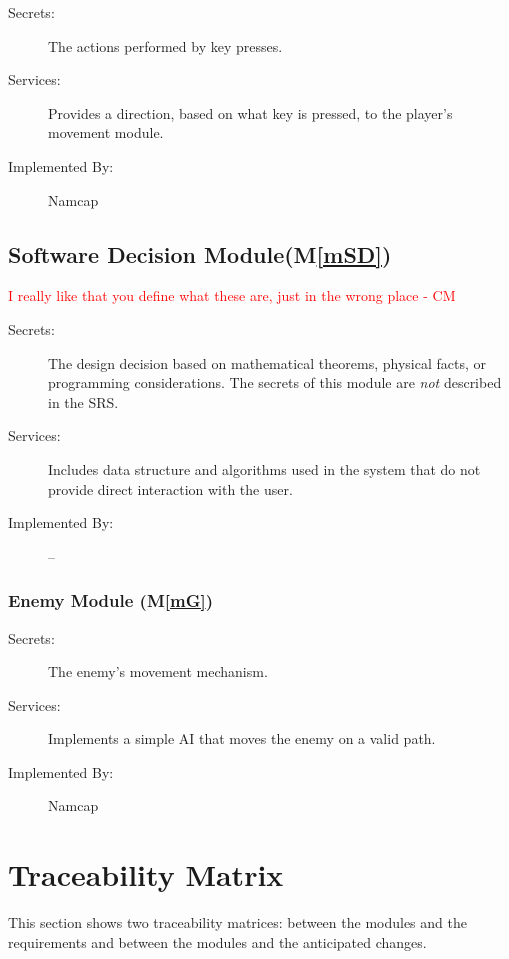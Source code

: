 \documentclass[12pt, titlepage]{article}
\newcommand{\mref}[1]{M\ref{#1}}
\begin{document}
\begin{description}
\item[Secrets:]The actions performed by key presses.
\item[Services:]Provides a direction, based on what key is pressed, to the player's movement module.
\item[Implemented By:] Namcap
\end{description}


\subsection{Software Decision Module(\mref{mSD})}
\textcolor{red}{I really like that you define what these are, just in the wrong place - CM} \\
\begin{description}
\item[Secrets:] The design decision based on mathematical theorems, physical
  facts, or programming considerations. The secrets of this module are
  \emph{not} described in the SRS.
\item[Services:] Includes data structure and algorithms used in the system that
  do not provide direct interaction with the user. 
\item[Implemented By:] --
\end{description}
\subsubsection{Enemy Module (\mref{mG})}

\begin{description}
\item[Secrets:]The enemy's movement mechanism.
\item[Services:]Implements a simple AI that moves the enemy on a valid path.
\item[Implemented By:] Namcap
\end{description}


\section{Traceability Matrix} \label{SecTM}

This section shows two traceability matrices: between the modules and the
requirements and between the modules and the anticipated changes.
\end{document}
